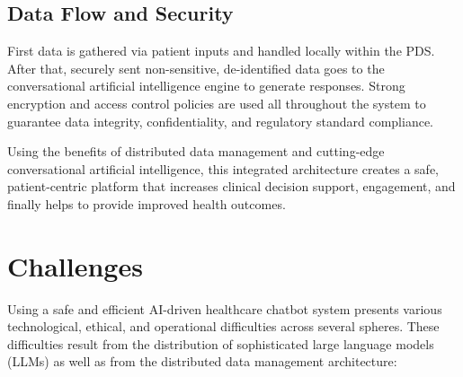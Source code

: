 \subsection{Data Flow and Security}
First data is gathered via patient inputs and handled locally within the PDS. After that, securely sent non-sensitive, de-identified data goes to the conversational artificial intelligence engine to generate responses. Strong encryption and access control policies are used all throughout the system to guarantee data integrity, confidentiality, and regulatory standard compliance.

Using the benefits of distributed data management and cutting-edge conversational artificial intelligence, this integrated architecture creates a safe, patient-centric platform that increases clinical decision support, engagement, and finally helps to provide improved health outcomes.


\section{Challenges}
\label{sec:challenges}

Using a safe and efficient AI-driven healthcare chatbot system presents various technological, ethical, and operational difficulties across several spheres.  These difficulties result from the distribution of sophisticated large language models (LLMs) as well as from the distributed data management architecture:


